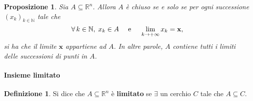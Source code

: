 \documentclass{article}
\theoremstyle{plain}
\newtheorem{prop}[thm]{Proposizione}
\theoremstyle{definition}
\newtheorem{defn}{Definizione}[section]
\theoremstyle{remark}
\begin{document}
\vspace{10pt}

\begin{bxthm}
\begin{prop}
Sia $A\subseteq\mathbb{R}^n$. Allora $A$ è chiuso se e solo se per ogni successione $(x_k)_{k\in\mathbb{N}}$ tale che 
\[
    \forall\, k\in\mathbb{N},\;x_k\in A \quad \textup{ e } \quad \lim_{k\to+\infty} x_k = \mathbf{x},
\]
si ha che il limite $\mathbf{x}$ appartiene ad $A$. In altre parole, $A$ contiene tutti i limiti delle successioni di punti in $A$.
\end{prop}
\end{bxthm}

\vspace{10pt}

\paragraph{Insieme limitato}
\begin{bxthm}
\begin{defn}
    Si dice che $A\subseteq\mathbb{R}^n$ è \textbf{limitato} se $\exists$ un cerchio $C$ tale che $A\subseteq C$.    
\end{defn}
\end{bxthm}

\vspace{10pt}
\end{document}
